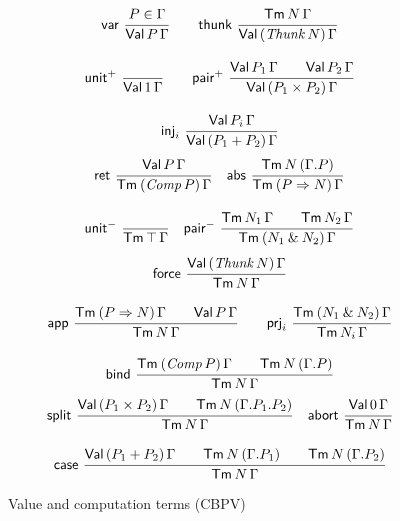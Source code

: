 \documentclass[sigconf,screen,fleqn]{acmart} %
\begin{document}
\begin{figure}[htbp]
\hrulefill
\begin{gather*}
  \nru{\tvar}{P \in \Gamma}{\PValT P \Gamma}
\qquad
  \nru{\tthunk}{\Tm N \Gamma}{\PValTP{\Thunk N}\Gamma}
\\[2ex]
  \nru{\punit}{}{\PValT{\tyone}\Gamma}
\qquad
  \nru{\ppair}
      {\PValT{P_1}\Gamma \qquad \PValT{P_2}\Gamma}
      {\PValTP{P_1 \times P_2}\Gamma}
\\[2ex]
  \nru{\tinj_i}{\PValT{P_i}\Gamma}{\PValTP{P_1 + P_2}\Gamma}
\end{gather*}
\dotfill
\begin{gather*}
  \nru{\tret}
      {\PValTm P \Gamma}
      {\TmP {\Comp P} \Gamma}
\quad
  \nru{\tabs}
      {\Tm N {(\cext \Gamma P)}}
      {\TmP {P \To N} \Gamma}
\\[2ex]
  \nru{\nunit}
      {}
      {\Tm \top \Gamma}
\quad
  \nru{\npair}
      {\Tm {N_1} \Gamma \qquad \Tm {N_2} \Gamma}
      {\TmP {N_1 \ntimes N_2} \Gamma}
\end{gather*}
\dotfill
\begin{gather*}
  \nru{\tforce}
      {\PValTmP {\Thunk N} \Gamma}
      {\Tm N \Gamma}
\\[2ex]
  \nru{\tapp}
      {\TmP {P \To N} \Gamma \qquad \PValTm P \Gamma}
      {\Tm N \Gamma}
\qquad
  \nru{\tprj_i}
      {\TmP {N_1 \ntimes N_2} \Gamma}
      {\Tm {N_i} \Gamma}
\\[2ex]
  \nru{\tbind}
      {\TmP {\Comp P} \Gamma \qquad \Tm N {(\cext \Gamma P)}}
      {\Tm N \Gamma}
\end{gather*}
\dotfill
\begin{gather*}
  \nru{\tsplit}
    {\PValTmP {P_1 \times P_2} \Gamma
      \qquad \Tm N {(\cext {\cext \Gamma P_1} P_2)}
    }{\Tm N \Gamma}
\quad
  \nru{\tabort}
    {\PValTm \tyzero \Gamma}
    {\Tm N \Gamma}
\\[2ex]
  \nru{\tcase}
    {\PValTmP {P_1 + P_2} \Gamma
      \qquad \Tm N {(\cext \Gamma P_1)}
      \qquad \Tm N {(\cext \Gamma P_2)}
    }{\Tm N \Gamma}
\end{gather*}
\hrulefill
  \caption{Value and computation terms (CBPV)}%
  \label{fig:tmcbpv}
\end{figure}
\end{document}
